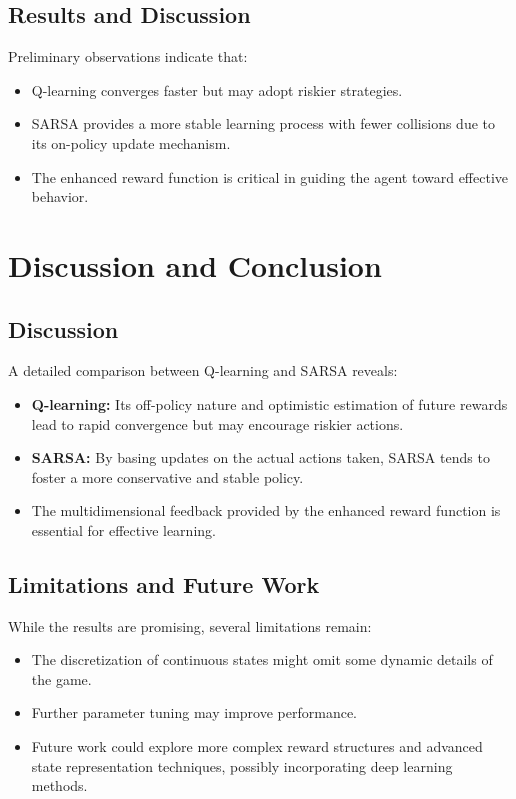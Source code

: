\documentclass[conference]{IEEEtran}
\begin{document}
\subsection{Results and Discussion}
Preliminary observations indicate that:
\begin{itemize}
    \item Q-learning converges faster but may adopt riskier strategies.
    \item SARSA provides a more stable learning process with fewer collisions due to its on-policy update mechanism.
    \item The enhanced reward function is critical in guiding the agent toward effective behavior.
\end{itemize}

\section{Discussion and Conclusion}
\subsection{Discussion}
A detailed comparison between Q-learning and SARSA reveals:
\begin{itemize}
    \item \textbf{Q-learning:} Its off-policy nature and optimistic estimation of future rewards lead to rapid convergence but may encourage riskier actions.
    \item \textbf{SARSA:} By basing updates on the actual actions taken, SARSA tends to foster a more conservative and stable policy.
    \item The multidimensional feedback provided by the enhanced reward function is essential for effective learning.
\end{itemize}

\subsection{Limitations and Future Work}
While the results are promising, several limitations remain:
\begin{itemize}
    \item The discretization of continuous states might omit some dynamic details of the game.
    \item Further parameter tuning may improve performance.
    \item Future work could explore more complex reward structures and advanced state representation techniques, possibly incorporating deep learning methods.
\end{itemize}
\end{document}
